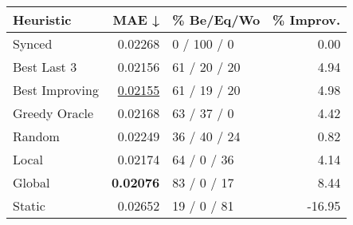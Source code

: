 \begin{tabular}{lrlr}
\toprule
\textbf{Heuristic} & \textbf{MAE ↓} & \textbf{\% Be/Eq/Wo} & \textbf{\% Improv.} \\
\midrule
            Synced &        0.02268 &          0 / 100 / 0 &                0.00 \\
\midrule
       Best Last 3 &        0.02156 &         61 / 20 / 20 &                4.94 \\
    Best Improving &        \underline{0.02155} &         61 / 19 / 20 &                4.98 \\
\addlinespace
     Greedy Oracle &        0.02168 &          63 / 37 / 0 &                4.42 \\
            Random &        0.02249 &         36 / 40 / 24 &                0.82 \\
\midrule
             Local &        0.02174 &          64 / 0 / 36 &                4.14 \\
            Global &        \textbf{0.02076} &          83 / 0 / 17 &                8.44 \\
\midrule
            Static &        0.02652 &          19 / 0 / 81 &              -16.95 \\
\bottomrule
\end{tabular}

\label{tab:iid_lr01_le1_bs4_Summary}
